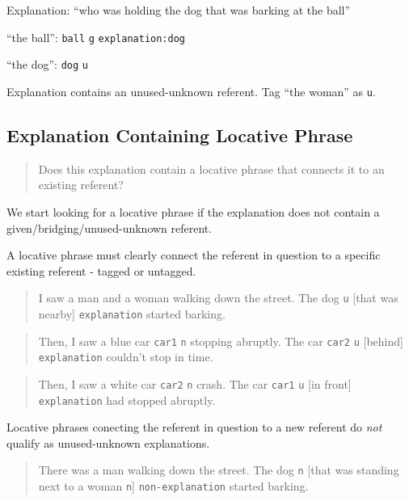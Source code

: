 \documentclass[
]{book}
\begin{document}
Explanation: ``who was holding the dog that was barking at the ball''

``the ball'': \texttt{ball} \texttt{g} \texttt{explanation:dog}

``the dog'': \texttt{dog} \texttt{u}

Explanation contains an unused-unknown referent.
Tag ``the woman'' as \texttt{u}.

\hypertarget{explanation-containing-locative-phrase}{%
\subsection{Explanation Containing Locative Phrase}\label{explanation-containing-locative-phrase}}

\begin{quote}
Does this explanation contain a locative phrase
that connects it to an existing referent?
\end{quote}

We start looking for a locative phrase if
the explanation does not contain a given/bridging/unused-unknown referent.

A locative phrase must clearly connect the referent in question
to a specific existing referent - tagged or untagged.

\begin{quote}
I saw a man and a woman walking down the street.
The dog \texttt{u} {[}that was nearby{]} \texttt{explanation} started barking.
\end{quote}

\begin{quote}
Then, I saw a blue car \texttt{car1} \texttt{n} stopping abruptly.
The car \texttt{car2} \texttt{u} {[}behind{]} \texttt{explanation} couldn't stop in time.
\end{quote}

\begin{quote}
Then, I saw a white car \texttt{car2} \texttt{n} crash.
The car \texttt{car1} \texttt{u} {[}in front{]} \texttt{explanation} had stopped abruptly.
\end{quote}

Locative phrases conecting the referent in question to a new referent
do \emph{not} qualify as unused-unknown explanations.

\begin{quote}
There was a man walking down the street.
The dog \texttt{n}
{[}that was standing next to a woman \texttt{n}{]} \texttt{non-explanation} started barking.
\end{quote}
\end{document}
